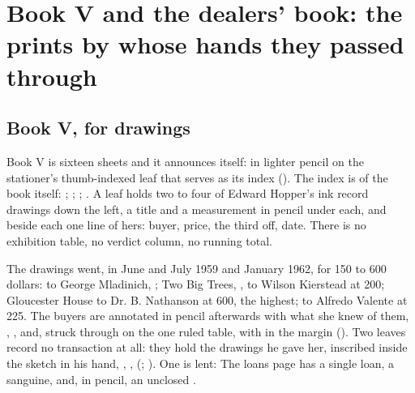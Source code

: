 \chapter{Book V and the dealers' book: the prints by whose hands they passed through}

\section{Book V, for drawings}

Book V is sixteen sheets and it announces itself:  in lighter pencil on the stationer's thumb-indexed leaf that serves as its index (). The index is of the book itself: ; ; ; . A leaf holds two to four of Edward Hopper's ink record drawings down the left, a title and a measurement in pencil under each, and beside each one line of hers: buyer, price, the third off, date. There is no exhibition table, no verdict column, no running total.

The drawings went, in June and July 1959 and January 1962, for 150 to 600 dollars:  to George Mladinich, ; Two Big Trees, , to Wilson Kierstead at 200; Gloucester House to Dr. B. Nathanson at 600, the highest;  to Alfredo Valente at 225. The buyers are annotated in pencil afterwards with what she knew of them, , , and, struck through on the one ruled table,  with  in the margin (). Two leaves record no transaction at all: they hold the drawings he gave her, inscribed inside the sketch in his hand, , ,  (; ). One is lent:  The loans page has a single loan, a sanguine,  and, in pencil, an unclosed .

